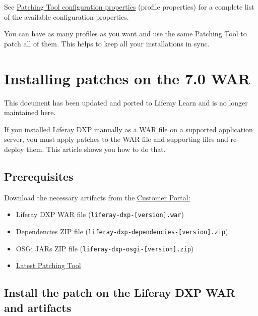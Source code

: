 See
\href{/docs/7-2/deploy/-/knowledge_base/d/patching-tool-configuration-properties}{Patching
Tool configuration properties} (profile properties) for a complete list
of the available configuration properties.

You can have as many profiles as you want and use the same Patching Tool
to patch all of them. This helps to keep all your installations in sync.

\chapter{Installing patches on the 7.0
WAR}\label{installing-patches-on-the-7.0-war}

{This document has been updated and ported to Liferay Learn and is no
longer maintained here.}

If you
\href{/docs/7-1/deploy/-/knowledge_base/d/installing-product-on-tomcat}{installed
Liferay DXP manually} as a WAR file on a supported application server,
you must apply patches to the WAR file and supporting files and
re-deploy them. This article shows you how to do that.

\section{Prerequisites}\label{prerequisites-1}

Download the necessary artifacts from the
\href{https://customer.liferay.com/downloads}{Customer Portal:}

\begin{itemize}
\tightlist
\item
  Liferay DXP WAR file (\texttt{liferay-dxp-{[}version{]}.war})
\item
  Dependencies ZIP file
  (\texttt{liferay-dxp-dependencies-{[}version{]}.zip})
\item
  OSGi JARs ZIP file (\texttt{liferay-dxp-osgi-{[}version{]}.zip})
\item
  \href{https://customer.liferay.com/downloads?p_p_id=com_liferay_osb_customer_downloads_display_web_DownloadsDisplayPortlet&_com_liferay_osb_customer_downloads_display_web_DownloadsDisplayPortlet_productAssetCategoryId=118191019&_com_liferay_osb_customer_downloads_display_web_DownloadsDisplayPortlet_fileTypeAssetCategoryId=118191066}{Latest
  Patching Tool}
\end{itemize}

\section{Install the patch on the Liferay DXP WAR and
artifacts}\label{install-the-patch-on-the-liferay-dxp-war-and-artifacts}

